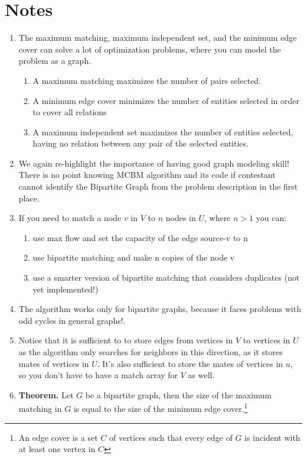 \documentclass[12pt]{book}
\begin{document}
\section{Notes}
\begin{enumerate}[label = \roman*.]
\item The maximum matching, maximum independent set, and the minimum edge cover can solve a lot of optimization problems, where you can model the problem as a graph.
\begin{enumerate}
\item A maximum matching maximizes the number of pairs selected.
\item A minimum edge cover minimizes the number of entities selected in order to cover all relations
\item A maximum independent set maximizes the number of entities selected, having no relation between any pair of the selected entities.
\end{enumerate}

\item We again re-highlight the importance of having good graph modeling skill! There is no point knowing MCBM algorithm and its code if contestant cannot identify the Bipartite Graph from the problem description in the first place.

\item If you need to match a node $v$ in $V$ to $n$ nodes in $U$, where $n > 1$ you can:
\begin{enumerate}
\item use max flow and set the capacity of the edge source-v to n
\item use bipartite matching and make n copies of the node v
\item use a smarter version of bipartite matching that considers duplicates (not yet implemented!)
\end{enumerate}

\item
The algorithm works only for bipartite graphs, because it faces problems with odd cycles in general graphs!.

\item
Notice that it is sufficient to to store edges from vertices in $V$ to vertices in $U$ as the algorithm only searches for neighbors in this direction, as it stores mates of vertices in $U$. It's also sufficient to store the mates of vertices in $u$, so you don't have to have a match array for $V$ as well.

\item
\textbf{Theorem. }Let $G$ be a bipartite graph, then the size of the maximum matching in $G$ is equal to the size of the minimum edge cover.\footnote{An edge cover is a set $C$ of vertices such that every edge of $G$ is incident with at least one vertex in $C$}


\end{enumerate}
\end{document}

